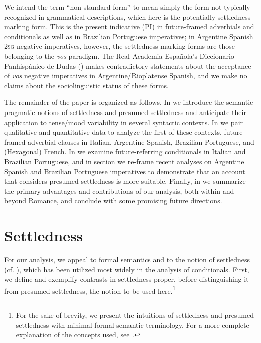 \documentclass[output=paper,colorlinks,citecolor=brown]{langscibook}
\begin{document}
We intend the term ``non-standard form'' to mean simply the form not typically recognized in grammatical descriptions, which here is the potentially settledness-marking form. This is the present indicative (PI) in future-framed adverbials and conditionals as well as in Brazilian Portuguese imperatives; in Argentine Spanish \textsc{2sg} negative imperatives, however, the settledness-marking forms are those belonging to the \textit{vos} paradigm. The Real Academia Española’s Diccionario Panhispánico de Dudas (\citeyear{RAE2005}) makes contradictory statements about the acceptance of \textit{vos} negative imperatives in Argentine/Rioplatense Spanish, and we make no claims about the sociolinguistic status of these forms.
 
The remainder of the paper is organized as follows. In  we introduce the semantic-pragmatic notions of settledness and presumed settledness and anticipate their application to tense/mood variability in several syntactic contexts. In  we pair qualitative and quantitative data to analyze the first of these contexts, future-framed adverbial clauses in Italian, Argentine Spanish, Brazilian Portuguese, and (Hexagonal) French. In  we examine future-referring conditionals in Italian and Brazilian Portuguese, and in section   we re-frame recent analyses on Argentine Spanish and Brazilian Portuguese imperatives to demonstrate that an account that considers presumed settledness is more suitable. Finally, in  we summarize the primary advantages and contributions of our analysis, both within and beyond Romance, and conclude with some promising future directions.

\section{Settledness}\label{sec:hoff:Settledness}

For our analysis, we appeal to formal semantics and to the notion of settledness (cf. \citealt{Prior1967,ThomasonGupta1980}), which has been utilized most widely in the analysis of conditionals. First, we define and exemplify contrasts in settledness proper, before distinguishing it from presumed settledness, the notion to be used here.\footnote{For the sake of brevity, we present the intuitions of settledness and presumed settledness with minimal formal semantic terminology. For a more complete explanation of the concepts used, see \citet{Hoff2019}.}
\end{document}
